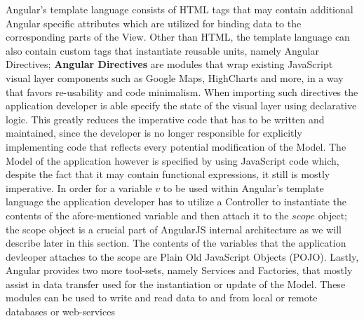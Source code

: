 {Angular's template language consists of HTML tags that may contain additional Angular specific attributes which are utilized for binding data to the corresponding parts of the View. Other than HTML, the template language can also contain custom tags that instantiate reusable units, namely Angular Directives; \textbf{Angular Directives} are modules that wrap existing JavaScript visual layer components such as Google Maps\cite{gmaps}, HighCharts\cite{kuan2012learning} and more, in a way that favors re-usability and code minimalism. When importing such directives the application developer is able specify the state of the visual layer using declarative logic. This greatly reduces the imperative code that has to be written and maintained, since the developer is no longer responsible for explicitly implementing code that reflects every potential modification of the Model. The Model of the application however is specified by using JavaScript code which, despite the fact that it may contain functional expressions, it still is mostly imperative. In order for a variable $v$ to be used within Angular's template language the application developer has to utilize a Controller to instantiate the contents of the afore-mentioned variable and then attach it to the $scope$ object; the  scope object is a crucial part of AngularJS internal architecture as we will describe later in this section. The contents of the variables that the application devleoper attaches to the scope are Plain Old JavaScript Objects (POJO). Lastly, Angular provides two more tool-sets, namely Services and Factories, that mostly assist in data transfer used for the instantiation or update of the Model. These modules can be used to write and read data to and from local or remote databases or web-services

}
